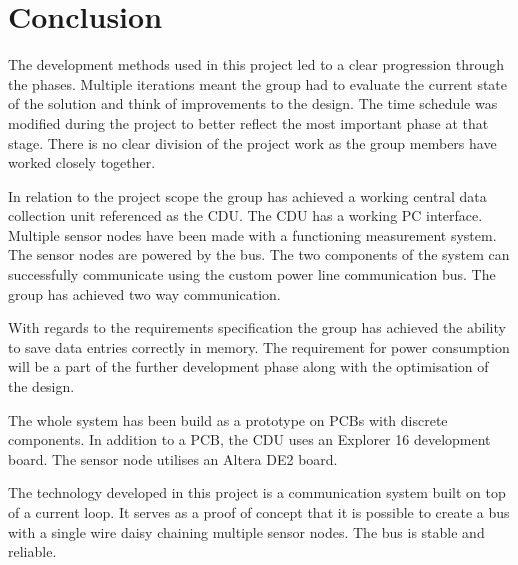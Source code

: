 \chapter{Conclusion}
The development methods used in this project led to a clear progression through the phases. Multiple iterations meant the group had to evaluate the current state of the solution and think of improvements to the design. The time schedule was modified during the project to better reflect the most important phase at that stage. There is no clear division of the project work as the group members have worked closely together.

In relation to the project scope the group has achieved a working central data collection unit referenced as the CDU. The CDU has a working PC interface. Multiple sensor nodes have been made with a functioning measurement system. The sensor nodes are powered by the bus. The two components of the system can successfully communicate using the custom power line communication bus. The group has achieved two way communication. 

With regards to the requirements specification the group has achieved the ability to save data entries correctly in memory. The requirement for power consumption will be a part of the further development phase along with the optimisation of the design.

The whole system has been build as a prototype on PCBs with discrete components. In addition to a PCB, the CDU uses an Explorer 16 development board. The sensor node utilises an Altera DE2 board.

The technology developed in this project is a communication system built on top of a current loop. It serves as a proof of concept that it is  possible to create a bus with a single wire daisy chaining multiple sensor nodes. The bus is stable and reliable. 
